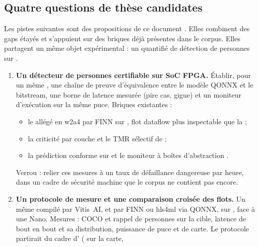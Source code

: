 \subsection{Quatre questions de thèse candidates}

Les pistes suivantes sont des propositions de ce document \deduit. Elles combinent des gaps
étayés et s'appuient sur des briques déjà présentes dans le corpus. Elles partagent un
même objet expérimental : un  quantifié de détection de personnes sur .

\begin{enumerate}
  \item \textbf{Un détecteur de personnes certifiable sur SoC FPGA.} Établir, pour un même
    , une chaîne de preuve d'équivalence entre le modèle QONNX et le bitstream, une borne
    de latence mesurée (pire cas, gigue) et un moniteur d'exécution sur la même puce.
    Briques existantes :
    \begin{itemize}
      \item le  allégé en w2a4 par FINN sur 
        \citep{arxiv-2609.24757-npu-accelerator-quantized-real-time}\pp, flot dataflow plus
        inspectable que la  \deduit ;
      \item la criticité par couche et le TMR sélectif de
        \citet{2019-libano-selective-hardening-neural-networks-fpgas} ;
      \item la prédiction conforme sur 
        \citep{arxiv-2304.06052-confident-object-detection-conformal-prediction}\pp{} et le
        moniteur à boîtes d'abstraction
        \citep{arxiv-1911.09032-outside-box-abstraction-monitoring-neural}.
    \end{itemize}
    Verrou : relier ces mesures à un taux de défaillance dangereuse par heure, dans un cadre
    de sécurité machine que le corpus ne contient pas encore.
  \item \textbf{Un protocole de mesure et une comparaison croisée des flots.} Un même 
    compilé par Vitis~AI, et par FINN ou hls4ml via QONNX, sur , face à une 
    Nano. Mesures :  COCO et rappel de personnes sur la cible, latence de bout en bout et
    sa distribution, puissance de puce et de carte. Le protocole partirait du cadre
    d'\citet{arxiv-2304.11580-framework-benchmarking-real-time-embedded} ( sur la carte,

\end{enumerate}
